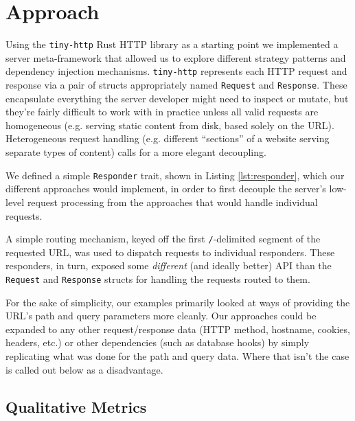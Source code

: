 \documentclass[sigconf]{acmart}
\def\code#1{\lstinline{#1}}
\begin{document}
\section{Approach}

Using the \code{tiny-http}\cite{github:tiny-http} Rust HTTP library as a starting point we implemented a server meta-framework that allowed us to explore different strategy patterns and dependency injection mechanisms. \code{tiny-http} represents each HTTP request and response via a pair of structs appropriately named \code{Request} and \code{Response}. These encapsulate everything the server developer might need to inspect or mutate, but they're fairly difficult to work with in practice unless all valid requests are homogeneous (e.g. serving static content from disk, based solely on the URL). Heterogeneous request handling (e.g. different ``sections'' of a website serving separate types of content) calls for a more elegant decoupling.

We defined a simple \code{Responder} trait, shown in Listing \ref{lst:responder}, which our different approaches would implement, in order to first decouple the server's low-level request processing from the approaches that would handle individual requests.

\begin{minipage}{\linewidth}

\end{minipage}

A simple routing mechanism, keyed off the first \code{/}-delimited segment of the requested URL, was used to dispatch requests to individual responders. These responders, in turn, exposed some \textit{different} (and ideally better) API than the \code{Request} and \code{Response} structs for handling the requests routed to them.

For the sake of simplicity, our examples primarily looked at ways of providing the URL's path and query parameters more cleanly. Our approaches could be expanded to any other request/response data (HTTP method, hostname, cookies, headers, etc.) or other dependencies (such as database hooks) by simply replicating what was done for the path and query data. Where that isn't the case is called out below as a disadvantage.

\subsection{Qualitative Metrics}
\end{document}
